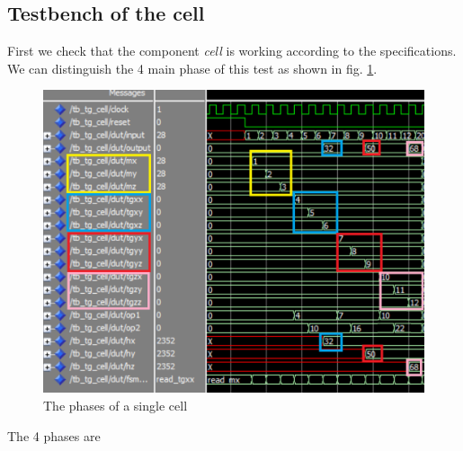 \subsection{Testbench of the cell} \label{tb_cell_3d}
First we check that the component \textit{cell} is working according to the specifications.
We can distinguish the 4 main phase of this test as shown in fig. \ref{fig:tb_cell_phases}.
  \begin{figure}[h]
  	\centering
  	\includegraphics[width=\textwidth]{imm/3d/tb_cell_phases.png}  
  	\caption{The phases of a single cell}
  	\label{fig:tb_cell_phases}
  \end{figure}
The 4 phases are
